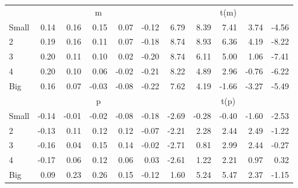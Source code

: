 \begin{table}[!ht]
\begin{tabular}{lrrrrrrrrrr}
      & \multicolumn{5}{c}{m} & \multicolumn{5}{c}{t(m)}
    
    \\
      \cmidrule(r){2-6} \cmidrule(r){7-11}

    Small   & 0.14  & 0.16  & 0.15  & 0.07  & -0.12  & 6.79  & 8.39  & 7.41  & 3.74  & -4.56  \\
         2  & 0.19  & 0.16  & 0.11  & 0.07  & -0.18  & 8.74  & 8.93  & 6.36  & 4.19  & -8.22  \\
         3  & 0.20  & 0.11  & 0.10  & 0.02  & -0.20  & 8.74  & 6.11  & 5.00  & 1.06  & -7.41  \\
         4  & 0.20  & 0.10  & 0.06  & -0.02  & -0.21  & 8.22  & 4.89  & 2.96  & -0.76  & -6.22  \\
    Big     & 0.16  & 0.07  & -0.03  & -0.08  & -0.22  & 7.62  & 4.19  & -1.66  & -3.27  & -5.49  \\

  
    
      & \multicolumn{5}{c}{p} & \multicolumn{5}{c}{t(p)}
    
    \\
      \cmidrule(r){2-6} \cmidrule(r){7-11}

    Small   & -0.14  & -0.01  & -0.02  & -0.08  & -0.18  & -2.69  & -0.28  & -0.40  & -1.60  & -2.53  \\
         2  & -0.13  & 0.11  & 0.12  & 0.12  & -0.07  & -2.21  & 2.28  & 2.44  & 2.49  & -1.22  \\
         3  & -0.16  & 0.04  & 0.15  & 0.14  & -0.02  & -2.71  & 0.81  & 2.99  & 2.44  & -0.27  \\
         4  & -0.17  & 0.06  & 0.12  & 0.06  & 0.03  & -2.61  & 1.22  & 2.21  & 0.97  & 0.32  \\
    Big     & 0.09  & 0.23  & 0.26  & 0.15  & -0.12  & 1.60  & 5.24  & 5.47  & 2.37  & -1.15  \\

  

  \bottomrule
\end{tabular}
\label{tbl:25_Size_Beta_B16}
\end{table}